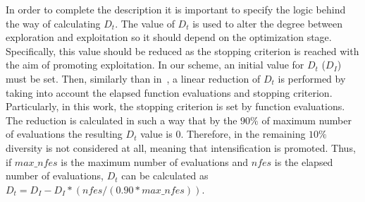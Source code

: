 In order to complete the description it is important to specify the logic behind the way of calculating $D_t$. 
%
The value of $D_t$ is used to alter the degree between exploration and exploitation so it should depend on the optimization stage.
%
Specifically, this value should be reduced as the stopping criterion is reached with the aim of promoting exploitation.
%
In our scheme, an initial value for $D_t$ ($D_I$) must be set.
%
Then, similarly than in~\cite{segura2016novel}, a linear reduction of $D_t$ is performed by taking into account the elapsed function evaluations and stopping criterion.
%
Particularly, in this work, the stopping criterion is set by function evaluations.
%
The reduction is calculated in such a way that by the $90\%$ of maximum number of evaluations the resulting $D_t$ value is $0$.
%
Therefore, in the remaining $10\%$ diversity is not considered at all, meaning that intensification is promoted.
%
Thus, if $max\_nfes$ is the maximum number of evaluations and $nfes$ is the elapsed number of evaluations, $D_t$ can be calculated as $D_t=D_I - D_I *(nfes/(0.90*max\_nfes))$.
%
%

%


